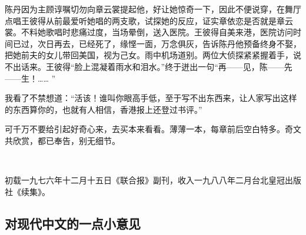 \par 陈丹因为主顾谆嘱切勿向章云裳提起他，好让她惊奇一下，因此不便说穿，在舞厅点唱王彼得从前最爱听她唱的两支歌，试探她的反应，证实章依恋是否就是章云裳。不料她歌唱时悲痛过度，当场晕倒，送入医院。王彼得自美来港，医院访问时间已过，次日再去，已经死了，缘悭一面，万念俱灰，告诉陈丹他预备终身不娶，把她前夫的女儿带回美国，视为己女。雨中机场道别。两位大侦探紧紧握着手，说不出话来。王彼得“脸上混凝着雨水和泪水。”终于迸出一句“再——见，陈——先——生！…… ”
\par 我看了不禁想道：“活该！谁叫你眼高手低，至于写不出东西来，让人家写出这样的东西算你的，也就有人相信，香港报上还登过书评。”
\par 可千万不要给引起好奇心来，去买本来看看。薄薄一本，每章前后空白特多。奇文共欣赏，都已奉告，别无细节。
\par  
\par *初载一九七六年十二月十五日《联合报》副刊，收入一九八八年二月台北皇冠出版社《续集》。



\subsection{对现代中文的一点小意见}


